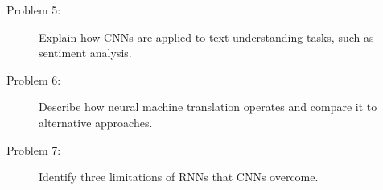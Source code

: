 \documentclass[10pt]{article}
\begin{document}
\begin{description}
\pagebreak

\item[Problem 5:] \hfill Explain how CNNs are applied to text understanding tasks, such as sentiment analysis.

\pagebreak

\item[Problem 6:] \hfill Describe how neural machine translation operates and compare it to alternative approaches.

\pagebreak

\item[Problem 7:] \hfill Identify three limitations of RNNs that CNNs overcome.

\end{description}
\end{document}
